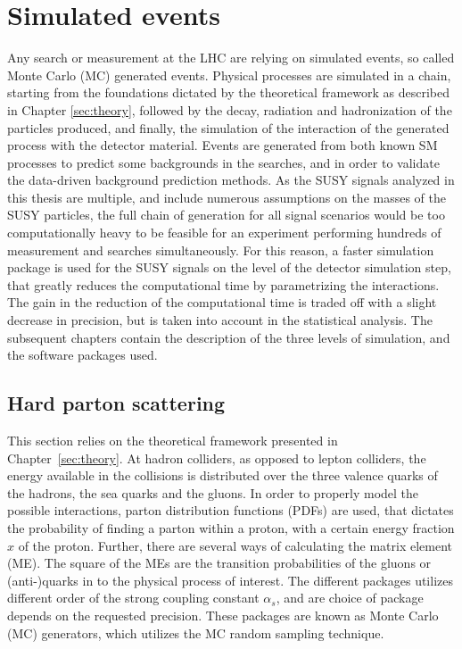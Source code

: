 \section{Simulated events}\label{sec:MC}
\noindent\justify
Any search or measurement at the LHC are relying on simulated events, so called Monte Carlo (MC) generated events. 
Physical processes are simulated in a chain, starting from the foundations dictated by the theoretical framework as described in Chapter \ref{sec:theory}, followed by the decay, radiation and hadronization of the particles produced, and finally, the simulation of the interaction of the generated process with the detector material. 
Events are generated from both known SM processes to predict some backgrounds in the searches, and in order to validate the data-driven background prediction methods. 
\newpara
\noindent\justify
As the SUSY signals analyzed in this thesis are multiple, and include numerous assumptions on the masses of the SUSY particles, the full chain of generation for all signal scenarios would be too computationally heavy to be feasible for an experiment performing hundreds of measurement and searches simultaneously. 
For this reason, a faster simulation package is used for the SUSY signals on the level of the detector simulation step, that greatly reduces the computational time by parametrizing the interactions. 
The gain in the reduction of the computational time is traded off with a slight decrease in precision, but is taken into account in the statistical analysis. 
The subsequent chapters contain the description of the three levels of simulation, and the software packages used. 
\subsection*{Hard parton scattering}
\noindent
\justify
This section relies on the theoretical framework presented in Chapter~\ref{sec:theory}. 
At hadron colliders, as opposed to lepton colliders, the energy available in the collisions is distributed over the three valence quarks of the hadrons, the sea quarks and the gluons. 
In order to properly model the possible interactions, parton distribution functions (PDFs) are used, that dictates the probability of finding a parton within a proton, with a certain energy fraction $x$ of the proton. 
Further, there are several ways of calculating the matrix element (ME). The square of the MEs are the transition probabilities of the gluons or (anti-)quarks in to the physical process of interest.
The different packages utilizes different order of the strong coupling constant $\alpha_{s}$, and are choice of package depends on the requested precision.
These packages are known as Monte Carlo (MC) generators, which utilizes the MC random sampling technique.  
